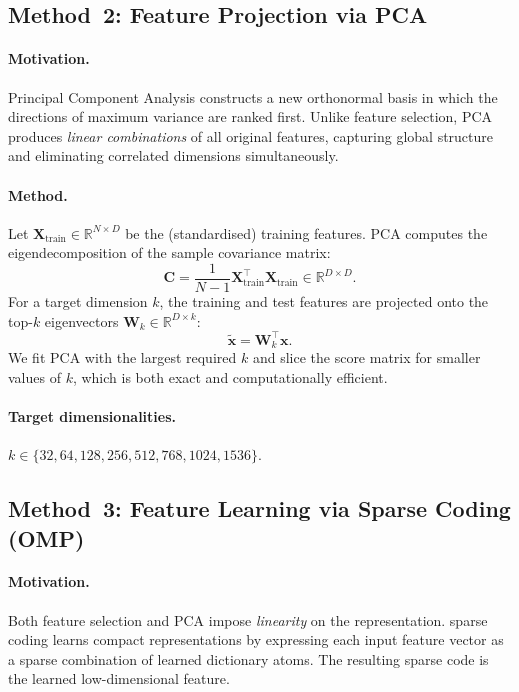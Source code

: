 \documentclass[10pt,letterpaper]{article}
\begin{document}
\subsection{Method~2: Feature Projection via PCA}
\label{sec:pca}

\paragraph{Motivation.}
Principal Component Analysis \cite{pearson1901pca,hotelling1933analysis}
constructs a new orthonormal basis in which the directions of maximum
variance are ranked first.
Unlike feature selection, PCA produces \emph{linear combinations} of all
original features, capturing global structure and eliminating correlated
dimensions simultaneously.

\paragraph{Method.}
Let $\mathbf{X}_{\text{train}} \in \mathbb{R}^{N \times D}$ be the
(standardised) training features.
PCA computes the eigendecomposition of the sample covariance matrix:
\begin{equation}
    \mathbf{C} = \frac{1}{N-1}\mathbf{X}_{\text{train}}^\top
                 \mathbf{X}_{\text{train}} \in \mathbb{R}^{D \times D}.
\end{equation}
For a target dimension $k$, the training and test features are projected
onto the top-$k$ eigenvectors $\mathbf{W}_k \in \mathbb{R}^{D \times k}$:
\begin{equation}
    \tilde{\mathbf{x}} = \mathbf{W}_k^\top \mathbf{x}.
    \label{eq:pca}
\end{equation}
We fit PCA with the largest required $k$ and slice the score matrix for
smaller values of $k$, which is both exact and computationally efficient.

\paragraph{Target dimensionalities.}
$k \in \{32, 64, 128, 256, 512, 768, 1024, 1536\}$.

\subsection{Method~3: Feature Learning via Sparse Coding (OMP)}
\label{sec:sc}

\paragraph{Motivation.}
Both feature selection and PCA impose \emph{linearity} on the
representation.
sparse coding learns compact representations by expressing each
input feature vector as a sparse combination of learned dictionary atoms.
The resulting sparse code is the learned low-dimensional feature.
\end{document}
